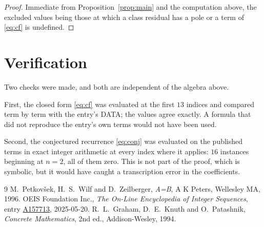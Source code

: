 \documentclass[11pt,a4paper]{article}
\theoremstyle{plain}
\theoremstyle{definition}
\begin{document}
\begin{proof}
Immediate from Proposition~\ref{prop:main} and the computation above, the excluded values
being those at which a class residual has a pole or a term of \eqref{eq:cf} is undefined.
\end{proof}

\section{Verification}

Two checks were made, and both are independent of the algebra above.

First, the closed form \eqref{eq:cf} was evaluated at the first $13$ indices and
compared term by term with the entry's DATA; the values agree exactly. A formula that did
not reproduce the entry's own terms would not have been used.

Second, the conjectured recurrence \eqref{eq:conj} was evaluated on the published terms in
exact integer arithmetic at every index where it applies: $16$ instances beginning at
$n=2$, all of them zero. This is not part of the proof, which is symbolic, but it
would have caught a transcription error in the coefficients.

\begin{thebibliography}{9}
 M.~Petkov\v{s}ek, H.~S.~Wilf and D.~Zeilberger, \emph{A=B}, A K Peters,
Wellesley MA, 1996.
 OEIS Foundation Inc., \emph{The On-Line Encyclopedia of Integer Sequences},
entry \href{https://oeis.org/A157713}{A157713}, 2025-05-20.
 R.~L.~Graham, D.~E.~Knuth and O.~Patashnik, \emph{Concrete Mathematics},
2nd ed., Addison-Wesley, 1994.
\end{thebibliography}
\end{document}
